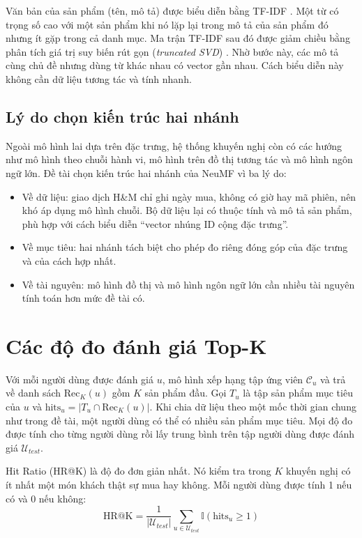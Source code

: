 Văn bản của sản phẩm (tên, mô tả) được biểu diễn bằng TF-IDF \parencite{salton1988term}. Một từ có trọng số cao với một sản phẩm khi nó lặp lại trong mô tả của sản phẩm đó nhưng ít gặp trong cả danh mục. Ma trận TF-IDF sau đó được giảm chiều bằng phân tích giá trị suy biến rút gọn (\textit{truncated SVD}) \parencite{deerwester1990lsa}. Nhờ bước này, các mô tả cùng chủ đề nhưng dùng từ khác nhau có vector gần nhau. Cách biểu diễn này không cần dữ liệu tương tác và tính nhanh.

\subsection{Lý do chọn kiến trúc hai nhánh}
\label{subsec:other_trends}

Ngoài mô hình lai dựa trên đặc trưng, hệ thống khuyến nghị còn có các hướng như mô hình theo chuỗi hành vi, mô hình trên đồ thị tương tác và mô hình ngôn ngữ lớn. Đề tài chọn kiến trúc hai nhánh của NeuMF vì ba lý do:
\begin{itemize}
    \item Về dữ liệu: giao dịch H\&M chỉ ghi ngày mua, không có giờ hay mã phiên, nên khó áp dụng mô hình chuỗi. Bộ dữ liệu lại có thuộc tính và mô tả sản phẩm, phù hợp với cách biểu diễn ``vector nhúng ID cộng đặc trưng''.
    \item Về mục tiêu: hai nhánh tách biệt cho phép đo riêng đóng góp của đặc trưng và của cách hợp nhất.
    \item Về tài nguyên: mô hình đồ thị và mô hình ngôn ngữ lớn cần nhiều tài nguyên tính toán hơn mức đề tài có.
\end{itemize}

\section{Các độ đo đánh giá Top-K}
\label{sec:metrics}

Với mỗi người dùng được đánh giá $u$, mô hình xếp hạng tập ứng viên $\mathcal{C}_u$ và trả về danh sách $\text{Rec}_K(u)$ gồm $K$ sản phẩm đầu. Gọi $T_u$ là tập sản phẩm mục tiêu của $u$ và $\text{hits}_u = |T_u \cap \text{Rec}_K(u)|$. Khi chia dữ liệu theo một mốc thời gian chung như trong đề tài, một người dùng có thể có nhiều sản phẩm mục tiêu. Mọi độ đo được tính cho từng người dùng rồi lấy trung bình trên tập người dùng được đánh giá $\mathcal{U}_{test}$.

Hit Ratio (HR@K) là độ đo đơn giản nhất. Nó kiểm tra trong $K$ khuyến nghị có ít nhất một món khách thật sự mua hay không. Mỗi người dùng được tính 1 nếu có và 0 nếu không:
\begin{equation*}
    \text{HR@K} = \frac{1}{|\mathcal{U}_{test}|} \sum_{u \in \mathcal{U}_{test}} \mathbb{I}\left( \text{hits}_u \ge 1 \right)
\end{equation*}

